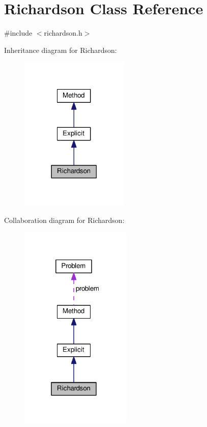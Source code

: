 \hypertarget{classRichardson}{}\section{Richardson Class Reference}
\label{classRichardson}


{\ttfamily \#include $<$richardson.\+h$>$}



Inheritance diagram for Richardson\+:
\nopagebreak
\begin{figure}[H]
\begin{center}
\leavevmode
\includegraphics[width=146pt]{classRichardson__inherit__graph}
\end{center}
\end{figure}


Collaboration diagram for Richardson\+:
\nopagebreak
\begin{figure}[H]
\begin{center}
\leavevmode
\includegraphics[width=151pt]{classRichardson__coll__graph}
\end{center}
\end{figure}
